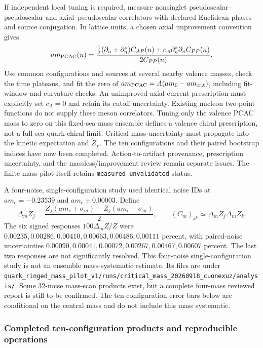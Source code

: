 \documentclass[11pt]{article}
\numberwithin{equation}{section}
\begin{document}
If independent local tuning is required, measure nonsinglet
pseudoscalar--pseudoscalar and axial--pseudoscalar correlators with declared
Euclidean phases and source conjugation. In lattice units, a chosen axial
improvement convention gives
\begin{equation}
 am_{\rm PCAC}(n)=
 \frac{\tfrac12(\partial_n+\partial_n^*)C_{AP}(n)
       +c_A\partial_n^*\partial_n C_{PP}(n)}{2C_{PP}(n)}.
\end{equation}
Use common configurations and sources at several nearby valence masses,
check the time plateaus, and fit the zero of
\(am_{\rm PCAC}=A(am_0-am_{\rm crit})\), including fit-window and curvature
checks. An unimproved axial-current prescription must explicitly set
\(c_A=0\) and retain its cutoff uncertainty. Existing nucleon two-point
functions do not supply these meson correlators. Tuning only the valence
PCAC mass to zero on this fixed-sea-mass ensemble defines a valence chiral
prescription, not a full sea-quark chiral limit. Critical-mass uncertainty
must propagate into the kinetic expectation and \(\mathring Z_\chi\).
The ten configurations and their paired bootstrap indices have now been
completed. Action-to-artifact provenance, prescription uncertainty, and the
massless/improvement review remain separate issues. The finite-mass pilot
itself retains \texttt{measured\_unvalidated} status.

A four-noise, single-configuration study used identical noise IDs at
\(am_c=-0.23539\) and \(am_c\pm0.00003\). Define
\begin{equation}
 \Delta_m Z_j=\frac{Z_j(am_c+\sigma_m)-Z_j(am_c-\sigma_m)}2,
 \qquad (C_m)_{jk}\simeq\Delta_mZ_j\Delta_mZ_k.
 \label{eq:ringed-mass-response}
\end{equation}
The six signed responses \(100\Delta_mZ/Z\) were
\(0.00235,0.00286,0.00410,0.00663,0.00486,0.00111\) percent,
with paired-noise uncertainties
\(0.00090,0.00041,0.00072,0.00267,0.00467,0.00607\) percent.
The last two responses are not significantly resolved. This four-noise
single-configuration study is not an ensemble mass-systematic estimate.
Its files are under
\nolinkurl{quark_ringed_mass_pilot_v1/runs/critical_mass_20260918_cuonexuz/analysis/}.
Some 32-noise mass-scan products exist, but a complete four-mass reviewed
report is still to be confirmed. The ten-configuration error bars below
are conditional on the central mass and do not include this mass systematic.

\subsubsection{Completed ten-configuration products and reproducible operations}
\label{sec:ringed-tenconf-results}
\end{document}
